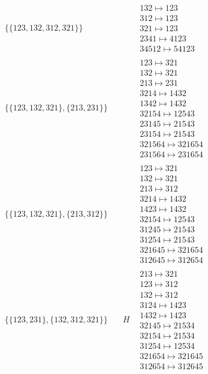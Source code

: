 \begin{tiny}
\begin{align}
\begin{matrix}
\end{matrix}
\\
\{\{123, 132, 312, 321\}\}
\quad
&
\phantom{.}
&
\begin{matrix}
132 \mapsto 123\\312 \mapsto 123\\321 \mapsto 123\\2341 \mapsto 4123\\34512 \mapsto 54123
\end{matrix}
\\
\{\{123, 132, 321\}, \{213, 231\}\}
\quad
&
\phantom{.}
&
\begin{matrix}
123 \mapsto 321\\132 \mapsto 321\\213 \mapsto 231\\3214 \mapsto 1432\\1342 \mapsto 1432\\32154 \mapsto 12543\\23145 \mapsto 21543\\23154 \mapsto 21543\\321564 \mapsto 321654\\231564 \mapsto 231654
\end{matrix}
\\
\{\{123, 132, 321\}, \{213, 312\}\}
\quad
&
\phantom{.}
&
\begin{matrix}
123 \mapsto 321\\132 \mapsto 321\\213 \mapsto 312\\3214 \mapsto 1432\\1423 \mapsto 1432\\32154 \mapsto 12543\\31245 \mapsto 21543\\31254 \mapsto 21543\\321645 \mapsto 321654\\312645 \mapsto 312654
\end{matrix}
\\
\{\{123, 231\}, \{132, 312, 321\}\}
\quad
&
H
&
\begin{matrix}
213 \mapsto 321\\123 \mapsto 312\\132 \mapsto 312\\3124 \mapsto 1423\\1432 \mapsto 1423\\32145 \mapsto 21534\\32154 \mapsto 21534\\31254 \mapsto 12534\\321654 \mapsto 321645\\312654 \mapsto 312645

\end{matrix}
\end{align}
\end{tiny}
